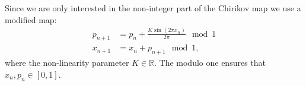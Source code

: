 Since we are only interested in the non-integer part of the Chirikov map we use a modified map:
\begin{subequations}\label{eq:chirikov}
	\begin{align}
		\label{eq:chirikov:p} p_{n + 1} &= p_n + \frac{K \sin \left(  2 \pi x_n \right)}{2 \pi} \mod 1 \\
		\label{eq:chirikov:x} x_{n + 1} &= x_n + p_{n + 1} \mod 1,
	\end{align}
\end{subequations}	
where the non-linearity parameter $K \in \mathbb{R}$. The modulo one ensures that $x_n, p_n \in \left[ 0, 1 \right]$.